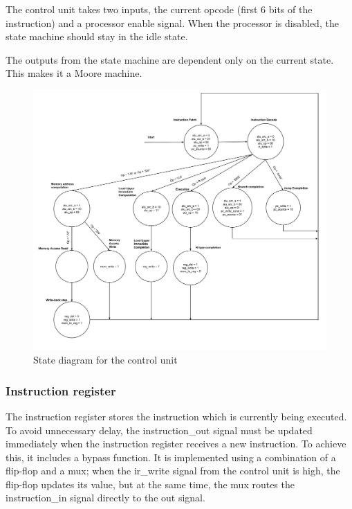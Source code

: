 The control unit takes two inputs, the current opcode (first 6 bits of the instruction) and a processor enable signal.
When the processor is disabled, the state machine should stay in the idle state.

The outputs from the state machine are dependent only on the current state.
This makes it a Moore machine.

\begin{figure}[ht!]
    \begin{center}
    \includegraphics[width=\textwidth]{assets/state_machine.pdf}
    \caption{State diagram for the control unit}
    \label{fig:state_machine}
    \end{center}
\end{figure}


\subsubsection{Instruction register}

The instruction register stores the instruction which is currently being executed.
To avoid unnecessary delay, the instruction\_out signal must be updated immediately when the instruction register receives a new instruction.
To achieve this, it includes a bypass function.
It is implemented using a combination of a flip-flop and a mux;
when the ir\_write signal from the control unit is high, the flip-flop updates its value,
but at the same time, the mux routes the instruction\_in signal directly to the out signal.

